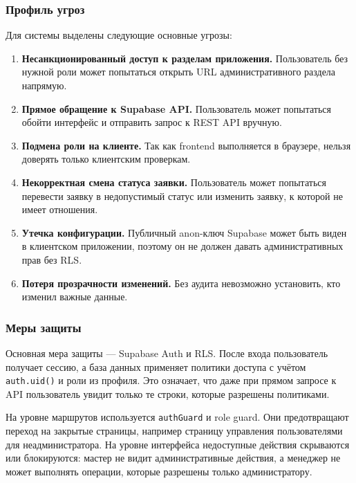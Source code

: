 \subsubsection{Профиль угроз}

Для системы выделены следующие основные угрозы:

\begin{enumerate}
	\item \textbf{Несанкционированный доступ к разделам приложения.} Пользователь без нужной роли может попытаться открыть URL административного раздела напрямую.
	
	\item \textbf{Прямое обращение к Supabase API.} Пользователь может попытаться обойти интерфейс и отправить запрос к REST API вручную.
	
	\item \textbf{Подмена роли на клиенте.} Так как frontend выполняется в браузере, нельзя доверять только клиентским проверкам.
	
	\item \textbf{Некорректная смена статуса заявки.} Пользователь может попытаться перевести заявку в недопустимый статус или изменить заявку, к которой не имеет отношения.
	
	\item \textbf{Утечка конфигурации.} Публичный anon-ключ Supabase может быть виден в клиентском приложении, поэтому он не должен давать административных прав без RLS.
	
	\item \textbf{Потеря прозрачности изменений.} Без аудита невозможно установить, кто изменил важные данные.
\end{enumerate}	

\subsubsection{Меры защиты}

Основная мера защиты --- Supabase Auth и RLS. После входа пользователь получает сессию, а база данных применяет политики доступа с учётом \texttt{auth.uid()} и роли из профиля. Это означает, что даже при прямом запросе к API пользователь увидит только те строки, которые разрешены политиками.

На уровне маршрутов используется \texttt{authGuard} и role guard. Они предотвращают переход на закрытые страницы, например страницу управления пользователями для неадминистратора. На уровне интерфейса недоступные действия скрываются или блокируются: мастер не видит административные действия, а менеджер не может выполнять операции, которые разрешены только администратору.

